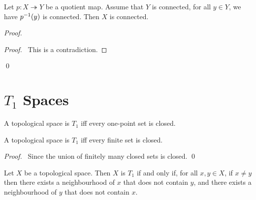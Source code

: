 \begin{prop}
Let $p : X \twoheadrightarrow Y$ be a quotient map. Assume that $Y$ is connected, for all $y \in Y$, we have ${p}^{-1}(y)$ is connected. Then $X$ is connected.
\end{prop}

\begin{proof}
\pf
{}
\qedstep
\begin{proof}
	\pf\ This is a contradiction.
\end{proof}
\qed
\end{proof}

\section{$T_1$ Spaces}

\begin{df}[$T_1$]
A topological space is $T_1$ iff every one-point set is closed.
\end{df}

\begin{prop}
A topological space is $T_1$ iff every finite set is closed.
\end{prop}

\begin{proof}
\pf\ Since the union of finitely many closed sets is closed. \qed
\end{proof}

\begin{prop}
Let $X$ be a topological space. Then $X$ is $T_1$ if and only if, for all $x,y \in X$, if $x \neq y$ then there exists a neighbourhood of $x$ that does not contain $y$, and there exists a neighbourhood of $y$ that does not contain $x$.
\end{prop}

